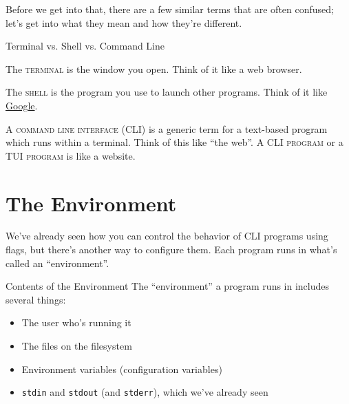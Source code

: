 Before we get into that, there are a few similar terms that are often confused;
let's get into what they mean and how they're different.

\begin{frame}{Terminal vs. Shell vs. Command Line}
  \begin{definition}[terminal]
    The \textsc{terminal} is the window you open.  Think of it like a web
    browser.
  \end{definition}

  \pause

  \begin{definition}[shell]
    The \textsc{shell} is the program you use to launch other programs.
    Think of it like \href{https://google.com}{Google}.
  \end{definition}

  \pause

  \begin{definition}[cli]
    A \textsc{command line interface (CLI)} is a generic term for a text-based program which runs
    within a terminal.  Think of this like \enquote{the web}.  A \textsc{CLI
    program} or a \textsc{TUI program} is like a website.
  \end{definition}
\end{frame}

\section{The Environment}

We've already seen how you can control the behavior of CLI programs using
flags, but there's another way to configure them.  Each program runs in what's
called an \enquote{environment}.

\begin{frame}{Contents of the Environment}
  The \enquote{environment} a program runs in includes several things:
  \pause
  \begin{itemize}
    \item
      The user who's running it\pause
    \item
      The files on the filesystem\pause
    \item
      Environment variables (configuration variables)\pause
    \item
      \texttt{stdin} and \texttt{stdout} (and \texttt{stderr}), which we've already seen
  \end{itemize}
\end{frame}

